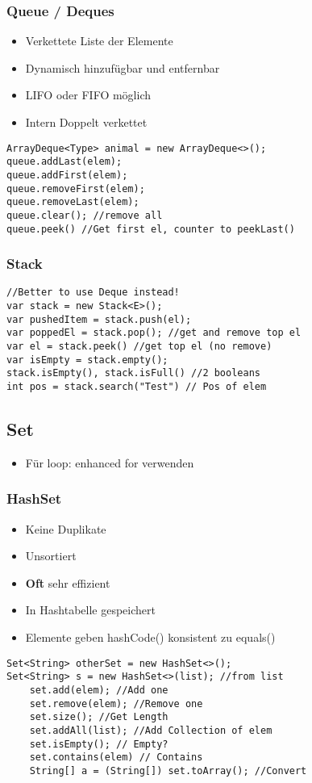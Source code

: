 \begin{multicols*}{5}
		\subsubsection{Queue / Deques}
		\begin{itemize}
			\item Verkettete Liste der Elemente
			\item Dynamisch hinzufügbar und entfernbar
			\item LIFO oder FIFO möglich
			\item Intern Doppelt verkettet
		\end{itemize}
		\begin{lstlisting}
ArrayDeque<Type> animal = new ArrayDeque<>();
queue.addLast(elem);
queue.addFirst(elem);
queue.removeFirst(elem);
queue.removeLast(elem);
queue.clear(); //remove all
queue.peek() //Get first el, counter to peekLast()
		\end{lstlisting}

	\subsubsection{Stack}
	\begin{lstlisting}
//Better to use Deque instead!
var stack = new Stack<E>();
var pushedItem = stack.push(el);
var poppedEl = stack.pop(); //get and remove top el
var el = stack.peek() //get top el (no remove)
var isEmpty = stack.empty();
stack.isEmpty(), stack.isFull() //2 booleans
int pos = stack.search("Test") // Pos of elem
	\end{lstlisting}
	
	\columnbreak

	\subsection{Set}
		\begin{itemize}
			\item Für loop: enhanced for verwenden
		\end{itemize}
		\subsubsection{HashSet}
		\begin{itemize}
			\item Keine Duplikate
			\item Unsortiert 
			\item \textbf{Oft} sehr effizient
			\item In Hashtabelle gespeichert
			\item Elemente geben hashCode() konsistent zu equals()
		\end{itemize}
		\begin{lstlisting}
Set<String> otherSet = new HashSet<>();
Set<String> s = new HashSet<>(list); //from list
	set.add(elem); //Add one
	set.remove(elem); //Remove one
	set.size(); //Get Length
	set.addAll(list); //Add Collection of elem
	set.isEmpty(); // Empty?
	set.contains(elem) // Contains
	String[] a = (String[]) set.toArray(); //Convert
		\end{lstlisting}

\end{multicols*}

